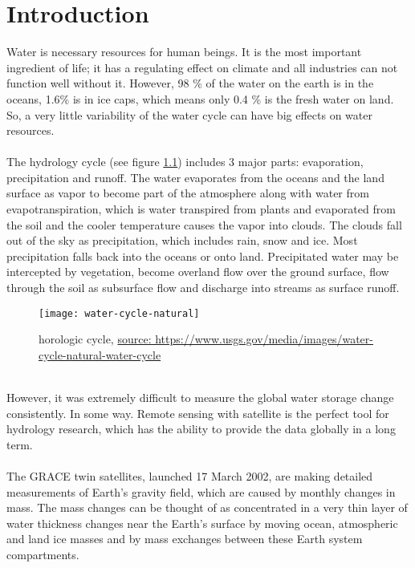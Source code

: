 \chapter{Introduction}
Water is necessary resources for human beings. It is the most important ingredient of life; it has
a regulating effect on climate and all industries can not function well without it. However, 98 \%
of the water on the earth is in the oceans, 1.6\% is in ice caps, which means only 0.4 \% is the
fresh water on land. So, a very little variability of the water cycle can have big effects on
water resources. \\\\
The hydrology cycle (see figure \ref{fig:hydrologic cycle}) includes 3 major parts: evaporation, precipitation and runoff. The water evaporates from the oceans and the land surface as vapor to become part of the atmosphere along with water from evapotranspiration, which is water transpired from plants and evaporated from the soil and the cooler temperature causes the vapor into clouds. The clouds fall out of the sky as precipitation, which includes rain, snow and ice. Most precipitation falls back into the oceans or onto land. Precipitated water may be intercepted by vegetation, become overland flow over the ground surface, flow through the soil as subsurface flow and discharge into streams as surface runoff. 
\begin{figure}[htbp]
	\centering
	\texttt{[image: water-cycle-natural]} %
	\caption{horologic cycle, \href{https://www.usgs.gov/media/images/water-cycle-natural-water-cycle}{source: https://www.usgs.gov/media/images/water-cycle-natural-water-cycle}} 
	\label{fig:hydrologic cycle}
\end{figure}\\
However, it was extremely difficult to measure the global water storage change consistently. In some way. Remote sensing with satellite is the perfect tool for hydrology research, which has the ability to provide the data globally in a long term.\\\\
The GRACE twin satellites, launched 17 March 2002, are making detailed measurements of Earth's gravity field, which are caused by monthly changes in mass. The mass changes can be thought of as concentrated in a very thin layer of water thickness changes near the Earth's surface by moving ocean, atmospheric and land ice masses and by mass exchanges between these Earth system compartments. \\\\
